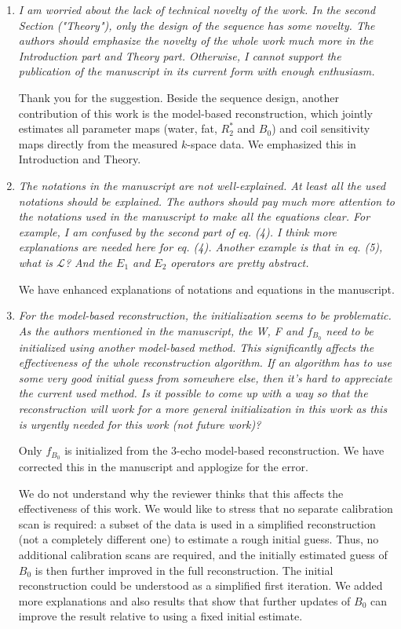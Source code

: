 \documentclass[a4paper,11pt]{report}
\begin{document}
\begin{enumerate}
	\item \textit{I am worried about the lack of technical novelty of the work. In the second Section ("Theory"), only the design of the sequence has some novelty. The authors should emphasize the novelty of the whole work much more in the Introduction part and Theory part. Otherwise, I cannot support the publication of the manuscript in its current form with enough enthusiasm.}

\hspace{1em} Thank you for the suggestion. Beside the sequence design, 
another contribution of this work is the model-based reconstruction, 
which jointly estimates all parameter maps (water, fat, $R_2^*$ and $B_0$) and 
coil sensitivity maps directly from the measured $k$-space data. 
We emphasized this  in Introduction and Theory.

	\item \textit{The notations in the manuscript are not well-explained. At least all the used notations should be explained. The authors should pay much more attention to the notations used in the manuscript to make all the equations clear. For example, I am confused by the second part of eq. (4). I think more explanations are needed here for eq. (4). Another example is that in eq. (5), what is $\mathcal{L}$? And the $E_1$ and $E_2$ operators are pretty abstract.}

\hspace{1em} We have enhanced explanations of notations and equations in the manuscript.

	\item \textit{For the model-based reconstruction, the initialization seems to be problematic. As the authors mentioned in the manuscript, the W, F and $f_{B_0}$ need to be initialized using another model-based method. This significantly affects the effectiveness of the whole reconstruction algorithm. If an algorithm has to use some very good initial guess from somewhere else, then it's hard to appreciate the current used method. Is it possible to come up with a way so that the reconstruction will work for a more general initialization in this work as this is urgently needed for this work (not future work)?}

\hspace{1em} Only $f_{B_0}$ is initialized from the 3-echo model-based reconstruction.
We have corrected this in the manuscript and applogize for the error.

We do not understand why the reviewer thinks that this affects the effectiveness
of this work. We would like to stress that no separate calibration scan is required:
a subset of the data is used in a simplified reconstruction (not a completely different one)
to estimate a rough initial guess.  Thus, no additional calibration scans are required,
and the initially estimated  guess of $B_0$ is then further improved in the full
reconstruction.  The initial reconstruction could be understood as a simplified
first iteration.  We added more explanations and also results that show that
further updates of $B_0$ can improve the result relative to using a fixed initial estimate.



\end{enumerate}
\end{document}
